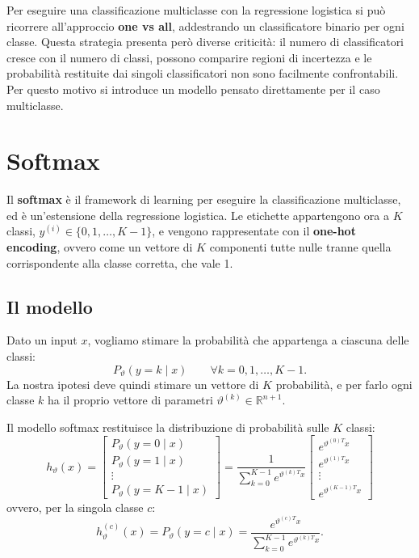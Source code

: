 Per eseguire una classificazione multiclasse con la regressione logistica si può ricorrere all'approccio \textbf{one vs all}, addestrando un classificatore binario per ogni classe. Questa strategia presenta però diverse criticità: il numero di classificatori cresce con il numero di classi, possono comparire regioni di incertezza e le probabilità restituite dai singoli classificatori non sono facilmente confrontabili. Per questo motivo si introduce un modello pensato direttamente per il caso multiclasse.

\section{Softmax}\label{sec:softmax}
Il \textbf{softmax} è il framework di learning per eseguire la classificazione multiclasse, ed è un'estensione della regressione logistica. Le etichette appartengono ora a $K$ classi, $y^{(i)} \in \{0, 1, \dots, K-1\}$, e vengono rappresentate con il \textbf{one-hot encoding}, ovvero come un vettore di $K$ componenti tutte nulle tranne quella corrispondente alla classe corretta, che vale 1.

\subsection{Il modello}
Dato un input $x$, vogliamo stimare la probabilità che appartenga a ciascuna delle classi:
\[
P_\vartheta(y = k \mid x) \qquad \forall k = 0, 1, \dots, K-1.
\]
La nostra ipotesi deve quindi stimare un vettore di $K$ probabilità, e per farlo ogni classe $k$ ha il proprio vettore di parametri $\vartheta^{(k)} \in \mathbb{R}^{n+1}$.

\begin{definizione}
Il modello softmax restituisce la distribuzione di probabilità sulle $K$ classi:
\[
h_\vartheta(x) =
\begin{bmatrix}
P_\vartheta(y = 0 \mid x) \\ P_\vartheta(y = 1 \mid x) \\ \vdots \\ P_\vartheta(y = K-1 \mid x)
\end{bmatrix}
= \frac{1}{\displaystyle\sum_{k=0}^{K-1} e^{\vartheta^{(k)T} x}}
\begin{bmatrix}
e^{\vartheta^{(0)T} x} \\ e^{\vartheta^{(1)T} x} \\ \vdots \\ e^{\vartheta^{(K-1)T} x}
\end{bmatrix}
\]
ovvero, per la singola classe $c$:
\[
h_\vartheta^{(c)}(x) = P_\vartheta(y = c \mid x) = \frac{e^{\vartheta^{(c)T} x}}{\displaystyle\sum_{k=0}^{K-1} e^{\vartheta^{(k)T} x}}.
\]
\end{definizione}

